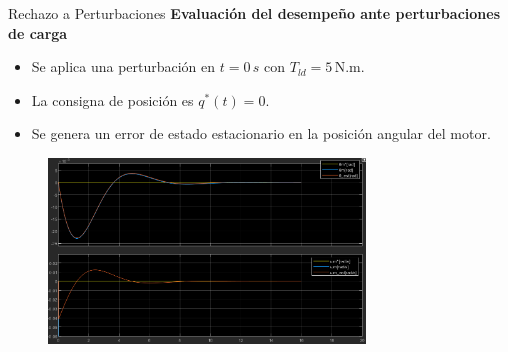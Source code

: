 \documentclass[12pt]{beamer}
\begin{document}
\begin{frame}{Rechazo a Perturbaciones}
    \textbf{Evaluación del desempeño ante perturbaciones de carga}
    \begin{itemize}
        \item Se aplica una perturbación en \( t = 0\,s\) con \( T_{ld} = 5\,\text{N.m} \).
        \item La consigna de posición es \( q^*(t) = 0 \).
        \item Se genera un error de estado estacionario en la posición angular del motor.
    \end{itemize}

    \begin{figure}
        \centering
        \includegraphics[width=0.75\textwidth]{Imagenes/RechazoPerturbacionesSimulacionCompleta.png}
\label{fig:RechazoPerturbacionesSimulacionCompleta}
    \end{figure}
\end{frame}
\end{document}
